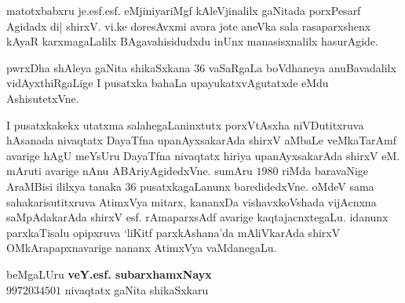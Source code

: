  matotxbabxru je.esf.esf. eMjiniyariMgf kAleVjinalilx gaNitada porxPesarf Agidadx di| shirxV. vi.ke doresAvxmi avara jote aneVka sala rasaparxshenx kAyaR karxmagaLalilx BAgavahisidudxdu inUnx manasisxnalilx hasurAgide.

 pwrxDha shAleya gaNita shikaSxkana $36$ vaSaRgaLa boVdhaneya anuBavadalilx vidAyxthiRgaLige I pusatxka bahaLa upayukatxvAgutatxde eMdu AshisutetxVne.

 I pusatxkakekx utatxma salahegaLaninxtutx porxVtAsxha niVDutitxruva hAsanada nivaqtatx DayaTfna upanAyxsakarAda shirxV aMbaLe veMkaTarAmf avarige hAgU meYsUru DayaTfna nivaqtatx hiriya upanAyxsakarAda shirxV eM. mAruti avarige nAnu ABAriyAgidedxVne. sumAru $1980$ riMda baravaNige AraMBisi ililxya tanaka $36$ pusatxkagaLanunx baredidedxVne. oMdeV sama sahakarisutitxruva AtimxVya mitarx, kananxDa vishavxkoVshada vijAcnxna saMpAdakarAda shirxV esf. rAmaparxsAdf avarige kaqtajacnxtegaLu. idanunx parxkaTisalu opipxruva `liKitf parxkAshana'da mAliVkarAda shirxV OMkArapapxnavarige nananx AtimxVya vaMdanegaLu.


 \bigskip
 
\begin{flushright}
 beMgaLUru \hfill{\bf veY.esf. subarxhamxNayx}\hfill\\
 $9972034501$  \hfill{nivaqtatx gaNita shikaSxkaru}\\
\end{flushright}
 
